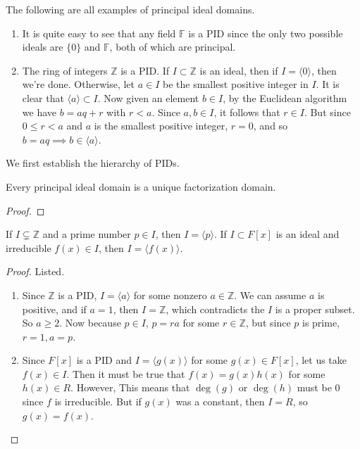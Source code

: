   \begin{example}
    The following are all examples of principal ideal domains. 
    \begin{enumerate}
      \item It is quite easy to see that any field $\mathbb{F}$ is a PID since the only two possible ideals are $\{0\}$ and $\mathbb{F}$, both of which are principal. 

      \item The ring of integers $\mathbb{Z}$ is a PID. If $I \subset \mathbb{Z}$ is an ideal, then if $I = \langle 0 \rangle$, then we're done. Otherwise, let $a \in I$ be the smallest positive integer in $I$. It is clear that $\langle a \rangle \subset I$. Now given an element $b \in I$, by the Euclidean algorithm we have $b = aq + r$ with $r < a$. Since $a, b \in I$, it follows that $r \in I$. But since $0 \leq r < a$ and $a$ is the smallest positive integer, $r = 0$, and so $b = aq \implies b \in \langle a \rangle$. 
    \end{enumerate}
  \end{example}

  We first establish the hierarchy of PIDs. 

  \begin{theorem}
    Every principal ideal domain is a unique factorization domain. 
  \end{theorem}
  \begin{proof}
    
  \end{proof}

  \begin{corollary}
    If $I \subsetneq \mathbb{Z}$ and a prime number $p \in I$, then $I = \langle p \rangle$. If $I \subset F[x]$ is an ideal and irreducible $f(x) \in I$, then $I = \langle f(x) \rangle$. 
  \end{corollary}
  \begin{proof}
    Listed. 
    \begin{enumerate}
      \item Since $\mathbb{Z}$ is a PID, $I = \langle a \rangle$ for some nonzero $a \in \mathbb{Z}$. We can assume $a$ is positive, and if $a = 1$, then $I = \mathbb{Z}$, which contradicts the $I$ is a proper subset. So $a \geq 2$. Now because $p \in I$, $p = ra$ for some $r \in \mathbb{Z}$, but since $p$ is prime, $r = 1, a = p$. 

      \item Since $F[x]$ is a PID and $I = \langle g(x) \rangle$ for some $g(x) \in F[x]$, let us take $f(x) \in I$. Then it must be true that $f(x) = g(x) h(x)$ for some $h(x) \in R$. However, This means that $\deg(g)$ or $\deg(h)$ must be $0$ since $f$ is irreducible. But if $g(x)$ was a constant, then $I = R$, so $g(x) = f(x)$. 
    \end{enumerate}
  \end{proof}

